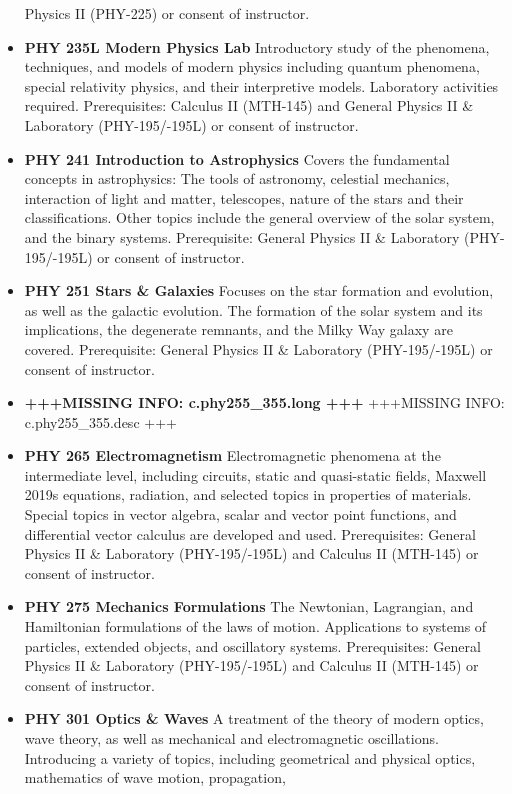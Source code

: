\documentclass[
  letterpaper,
]{scrbook}
\begin{document}
\begin{itemize}
  Physics II (PHY-225) or consent of instructor.
\item
  \textbf{PHY 235L Modern Physics Lab} Introductory study of the
  phenomena, techniques, and models of modern physics including quantum
  phenomena, special relativity physics, and their interpretive models.
  Laboratory activities required. Prerequisites: Calculus II (MTH-145)
  and General Physics II \& Laboratory (PHY-195/-195L) or consent of
  instructor.
\item
  \textbf{PHY 241 Introduction to Astrophysics} Covers the fundamental
  concepts in astrophysics: The tools of astronomy, celestial mechanics,
  interaction of light and matter, telescopes, nature of the stars and
  their classifications. Other topics include the general overview of
  the solar system, and the binary systems. Prerequisite: General
  Physics II \& Laboratory (PHY-195/-195L) or consent of instructor.
\item
  \textbf{PHY 251 Stars \& Galaxies} Focuses on the star formation and
  evolution, as well as the galactic evolution. The formation of the
  solar system and its implications, the degenerate remnants, and the
  Milky Way galaxy are covered. Prerequisite: General Physics II \&
  Laboratory (PHY-195/-195L) or consent of instructor.
\item
  \textbf{+++MISSING INFO: c.phy255\_355.long +++} +++MISSING INFO:
  c.phy255\_355.desc +++
\item
  \textbf{PHY 265 Electromagnetism} Electromagnetic phenomena at the
  intermediate level, including circuits, static and quasi-static
  fields, Maxwell 2019s equations, radiation, and selected topics in
  properties of materials. Special topics in vector algebra, scalar and
  vector point functions, and differential vector calculus are developed
  and used. Prerequisites: General Physics II \& Laboratory
  (PHY-195/-195L) and Calculus II (MTH-145) or consent of instructor.
\item
  \textbf{PHY 275 Mechanics Formulations} The Newtonian, Lagrangian, and
  Hamiltonian formulations of the laws of motion. Applications to
  systems of particles, extended objects, and oscillatory systems.
  Prerequisites: General Physics II \& Laboratory (PHY-195/-195L) and
  Calculus II (MTH-145) or consent of instructor.
\item
  \textbf{PHY 301 Optics \& Waves} A treatment of the theory of modern
  optics, wave theory, as well as mechanical and electromagnetic
  oscillations. Introducing a variety of topics, including geometrical
  and physical optics, mathematics of wave motion, propagation,

\end{itemize}
\end{document}
